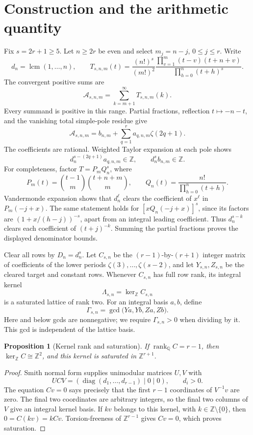 \documentclass[11pt]{article}
\newtheorem{proposition}[theorem]{Proposition}
\theoremstyle{remark}
\newcommand{\Z}{\mathbb Z}
\newcommand{\Q}{\mathbb Q}
\newcommand{\cA}{\mathcal A}
\DeclareMathOperator{\diag}{diag}
\begin{document}
\section{Construction and the arithmetic quantity}
Fix \(s=2r+1\ge5\). Let \(n\ge2r\) be even and select
\(m_j=n-j\), \(0\le j\le r\). Write
\[
 d_n=\operatorname{lcm}(1,\ldots,n),\qquad
 T_{s,n,m}(t)=\frac{(n!)^s}{(m!)^2}
 \frac{\prod_{v=1}^{m}(t-v)(t+n+v)}
      {\prod_{h=0}^{n}(t+h)^s}.
\]
The convergent positive sums are
\[
 \cA_{s,n,m}=\sum_{k=m+1}^{\infty}T_{s,n,m}(k).
\]
Every summand is positive in this range. Partial fractions, reflection
\(t\mapsto-n-t\), and the vanishing total simple-pole residue give
\begin{equation}
 \cA_{s,n,m}=b_{n,m}+
    \sum_{q=1}^{r} a_{q,n,m}\zeta(2q+1).
 \label{eq:expansion}
\end{equation}
The coefficients are rational. Weighted Taylor expansion at each pole
shows
\[
 d_n^{s-(2q+1)}a_{q,n,m}\in\Z,\qquad d_n^s b_{n,m}\in\Z.
\]
For completeness, factor \(T=P_mQ_n^s\), where
\[
 P_m(t)=\binom{t-1}{m}\binom{t+n+m}{m},\qquad
 Q_n(t)=\frac{n!}{\prod_{h=0}^{n}(t+h)}.
\]
Vandermonde expansion shows that \(d_n^\ell\) clears the coefficient
of \(x^\ell\) in \(P_m(-j+x)\). The same statement holds for
\([xQ_n(-j+x)]^s\), since its factors are
\((1+x/(h-j))^{-s}\), apart from an integral leading coefficient.
Thus \(d_n^{s-k}\) clears each coefficient of \((t+j)^{-k}\).
Summing the partial fractions proves the displayed denominator bounds.

Clear all rows by \(D_n=d_n^s\). Let \(C_{s,n}\) be the
\((r-1)\)-by-\((r+1)\) integer matrix of coefficients of the lower
periods \(\zeta(3),\ldots,\zeta(s-2)\), and let \(Y_{s,n},Z_{s,n}\)
be the cleared target and constant rows. Whenever \(C_{s,n}\) has full
row rank, its integral kernel
\[
 \Lambda_{s,n}=\ker_{\Z} C_{s,n}
\]
is a saturated lattice of rank two. For an integral basis \(a,b\), define
\begin{equation}
 \Gamma_{s,n}=\gcd\bigl(Y a,Y b,Z a,Z b\bigr).
 \label{eq:gamma}
\end{equation}
Here and below gcds are nonnegative; we require \(\Gamma_{s,n}>0\)
when dividing by it. This gcd is independent of the lattice basis.

\begin{proposition}[Kernel rank and saturation]
If \(\operatorname{rank}_{\Q}C=r-1\), then
\(\ker_{\Z}C\cong\Z^2\), and this kernel is saturated in \(\Z^{r+1}\).
\end{proposition}
\begin{proof}
Smith normal form supplies unimodular matrices \(U,V\) with
\[
 UCV=(\diag(d_1,\ldots,d_{r-1})\mid0\mid0),\qquad d_i>0.
\]
The equation \(Cv=0\) says precisely that the first \(r-1\) coordinates
of \(V^{-1}v\) are zero. The final two coordinates are arbitrary integers,
so the final two columns of \(V\) give an integral kernel basis.
If \(kv\) belongs to this kernel, with \(k\in\Z\setminus\{0\}\), then
\(0=C(kv)=kCv\). Torsion-freeness of \(\Z^{r-1}\) gives \(Cv=0\),
which proves saturation.
\end{proof}
\end{document}
